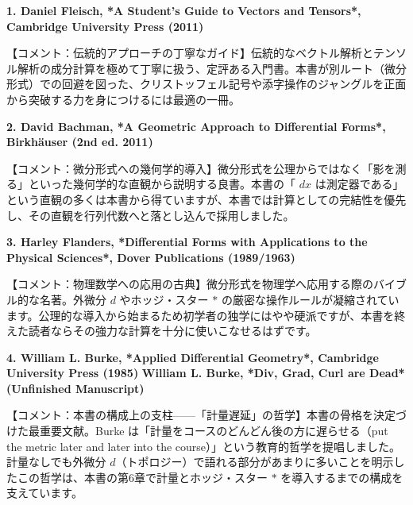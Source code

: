 \documentclass[a4paper,12pt,openany]{book}
\begin{document}
\textbf{1. Daniel Fleisch, *A Student's Guide to Vectors and Tensors*, Cambridge University Press (2011)}

【コメント：伝統的アプローチの丁寧なガイド】伝統的なベクトル解析とテンソル解析の成分計算を極めて丁寧に扱う、定評ある入門書。本書が別ルート（微分形式）での回避を図った、クリストッフェル記号や添字操作のジャングルを正面から突破する力を身につけるには最適の一冊。

\par\vspace{0.35em}\par

\textbf{2. David Bachman, *A Geometric Approach to Differential Forms*, Birkhäuser (2nd ed. 2011)}

【コメント：微分形式への幾何学的導入】微分形式を公理からではなく「影を測る」といった幾何学的な直観から説明する良書。本書の「
\(dx\)
は測定器である」という直観の多くは本書から得ていますが、本書では計算としての完結性を優先し、その直観を行列代数へと落とし込んで採用しました。

\par\vspace{0.35em}\par

\textbf{3. Harley Flanders, *Differential Forms with Applications to the Physical Sciences*, Dover Publications (1989/1963)}

【コメント：物理数学への応用の古典】微分形式を物理学へ応用する際のバイブル的な名著。外微分
\(d\) やホッジ・スター \(\ast\)
の厳密な操作ルールが凝縮されています。公理的な導入から始まるため初学者の独学にはやや硬派ですが、本書を終えた読者ならその強力な計算を十分に使いこなせるはずです。

\par\vspace{0.35em}\par

\textbf{4. William L. Burke, *Applied Differential Geometry*, Cambridge University Press (1985)}
\textbf{William L. Burke, *Div, Grad, Curl are Dead* (Unfinished Manuscript)}

【コメント：本書の構成上の支柱——「計量遅延」の哲学】本書の骨格を決定づけた最重要文献。Burke
は「計量をコースのどんどん後の方に遅らせる（put the metric later and
later into the
course）」という教育的哲学を提唱しました。計量なしでも外微分
\(d\)（トポロジー）で語れる部分があまりに多いことを明示したこの哲学は、本書の第6章で計量とホッジ・スター
\(\ast\) を導入するまでの構成を支えています。

\par\vspace{0.35em}\par
\end{document}
